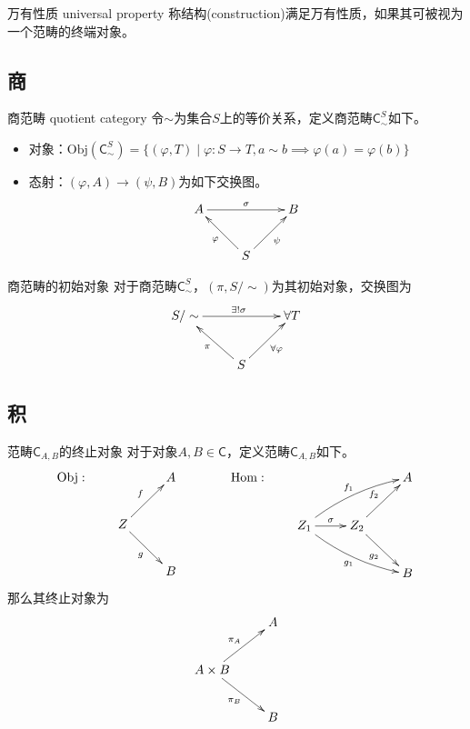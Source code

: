 \begin{definition}{万有性质 universal property}
	称结构(construction)满足万有性质，如果其可被视为一个范畴的终端对象。
\end{definition}

\subsection{商}

\begin{definition}{商范畴 quotient category}
	令$\sim$为集合$S$上的等价关系，定义商范畴$\mathsf{C}_{\sim}^S$如下。
	
	\begin{itemize}
		\item 对象：$\mathrm{Obj}(\mathsf{C}_{\sim}^S)=\{ (\varphi,T)\mid \varphi:S\to T,a\sim b\implies \varphi(a)=\varphi(b) \}$
		\item 态射：$(\varphi,A)\to(\psi,B)$为如下交换图。
		$$
		\xymatrix{
			A \ar^\sigma[rr]& &B\\
			& S \ar[ul]^{\varphi} \ar[ur]_{\psi} &
		}
		$$
	\end{itemize}
\end{definition}

\begin{proposition}{商范畴的初始对象}
	对于商范畴$\mathsf{C}_{\sim}^S$，$(\pi,S/\sim)$为其初始对象，交换图为
	$$
	\xymatrix{
		S/\sim \ar^{\exists!\sigma}[rr]& &\forall T\\
		& S \ar[ul]^{\pi} \ar[ur]_{\forall\varphi} &
	}
	$$
\end{proposition}

\subsection{积}

\begin{proposition}{范畴$\mathsf{C}_{A,B}$的终止对象}
	对于对象$A,B\in\mathsf{C}$，定义范畴$\mathsf{C}_{A,B}$如下。
	$$
	\mathrm{Obj}:\qquad
	\xymatrix{
		& A \\
		Z\ar[ur]^f \ar[dr]_g \\
		& B
	}
	\qquad\qquad 
	\mathrm{Hom}:\qquad
	\xymatrix{
		& &A \\
		Z_1 \ar[r]^{\sigma} \ar@/^/[urr]^{f_1} \ar@/_/[drr]_{g_1} & Z_2 \ar[ur]^{f_2} \ar[dr]_{g_2} \\
		& &B
	}
	$$
	那么其终止对象为
	$$
	\xymatrix{
		& A \\
		A\times B\ar[ur]^{\pi_A} \ar[dr]_{\pi_B} \\
		& B
	}
	$$
\end{proposition}

